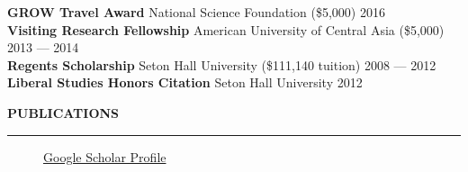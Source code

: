 \documentclass{resume} %
\begin{document}
\begin{minipage}{\textwidth}

{\bf GROW Travel Award} \hfill {\footnotesize National Science Foundation (\$5,000)} \hfill  {2016} \\




{\bf Visiting Research Fellowship} \hfill {\footnotesize American University of Central Asia (\$5,000)} \hfill {2013 --- 2014} \\ 


{\bf Regents Scholarship} \hfill {\footnotesize Seton Hall University (\$111,140 tuition)} \hfill {2008 --- 2012} \\


{\bf Liberal Studies Honors Citation} \hfill {\footnotesize Seton Hall University} \hfill {2012} \\

\end{minipage}


\newpage

\vspace{.5cm}
\sectionskip
\MakeUppercase{\textbf{Publications}}
  \sectionlineskip
  \hrule
\vspace{.5cm}

  \begin{figure}[H]
    \begin{minipage}{\textwidth}
      \centering
      
      
        \href{https://scholar.google.com/citations?user=XiAmdnYAAAAJ}{Google Scholar Profile}
      \end{minipage}
  \end{figure}
\end{document}
